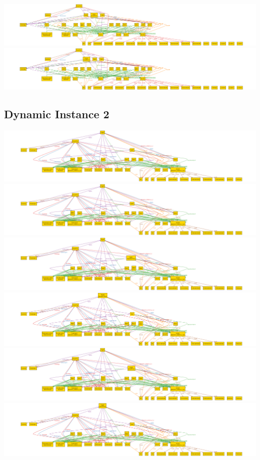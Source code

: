 \documentclass[12pt,a4paper,titlepage]{article}
\begin{document}
\includegraphics[width=\textwidth]{dynamic_instance_1_time_8}
\includegraphics[width=\textwidth]{dynamic_instance_1_time_9}
\subsection{Dynamic Instance 2}
\includegraphics[width=\textwidth]{dynamic_instance_2_time_0}
\includegraphics[width=\textwidth]{dynamic_instance_2_time_1}
\includegraphics[width=\textwidth]{dynamic_instance_2_time_2}
\includegraphics[width=\textwidth]{dynamic_instance_2_time_3}
\includegraphics[width=\textwidth]{dynamic_instance_2_time_4}
\includegraphics[width=\textwidth]{dynamic_instance_2_time_5}
\end{document}
